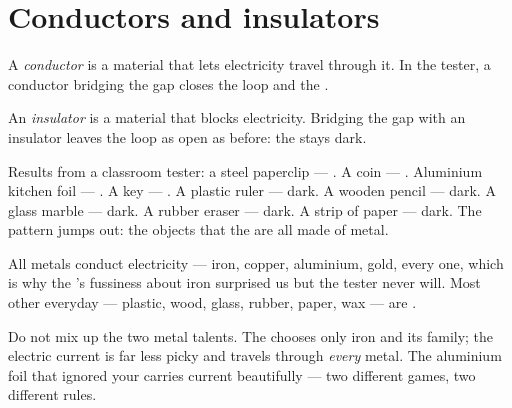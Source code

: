 \section{Conductors and insulators}

\begin{definition}[Conductor]\label{def:g4:conductors-insulators:conductor}
A \emph{conductor} is a material that lets electricity
travel through it. In the tester, a conductor bridging the gap
closes the loop and  the .
\end{definition}

\begin{definition}[Insulator]\label{def:g4:conductors-insulators:insulator}
An \emph{insulator} is a material that blocks
electricity. Bridging the gap with an insulator leaves the loop as
open as before: the  stays dark.
\end{definition}

\begin{example}\label{ex:g4:conductors-insulators:trials}
Results from a classroom tester: a steel paperclip --- . A
coin --- . Aluminium kitchen foil --- . A key --- .
A plastic ruler --- dark. A wooden pencil --- dark. A glass marble
--- dark. A rubber eraser --- dark. A strip of paper --- dark. The
pattern jumps out: the objects that  the  are all made of
metal.
\end{example}

\begin{proposition}\label{prop:g4:conductors-insulators:metals}
All metals conduct electricity --- iron, copper, aluminium, gold,
every one, which is why the 's fussiness about iron surprised
us but the tester never will. Most other everyday  ---
plastic, wood, glass, rubber, paper, wax --- are .
\end{proposition}

\begin{remark}\label{rem:g4:conductors-insulators:notmagnet}
Do not mix up the two metal talents. The  chooses only iron
and its family; the electric current is far less picky and travels
through \emph{every} metal. The aluminium foil that ignored your
 carries current beautifully --- two different games, two
different rules.
\end{remark}

